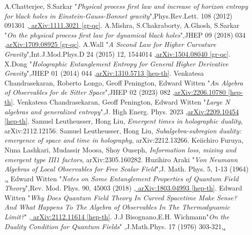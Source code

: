 \documentclass[12pt]{article}
\begin{document}
\begin{thebibliography}{100}
 A.Chatterjee, S.Sarkar "\textit{Physical process first law and increase of horizon entropy for black holes in Einstein-Gauss-Bonnet gravity}",Phys.Rev.Lett. 108 (2012) 091301 ,\href{https://arxiv.org/abs/1111.3021}{	 arXiv:1111.3021 [gr-qc]}.
 A.Mishra, S.Chakraborty, A.Ghosh, S.Sarkar "\textit{On the physical process first law for dynamical black holes}",JHEP 09 (2018) 034  ,\href{https://arxiv.org/abs/1709.08925}{arXiv:1709.08925 [gr-qc]}.
 A.Wall "\textit{A Second Law for Higher Curvature Gravity}",Int.J.Mod.Phys.D 24 (2015) 12, 1544014 ,\href{https://arxiv.org/abs/1504.08040}{arXiv:1504.08040 [gr-qc]}.
 X.Dong "\textit{Holographic Entanglement Entropy for General Higher Derivative Gravity}",JHEP 01 (2014) 044  ,\href{https://arxiv.org/abs/1310.5713}{arXiv:1310.5713 [hep-th]}.
 Venkatesa Chandrasekaran, Roberto Longo, Geoff Penington, Edward Witten "\textit{An Algebra of Observables for de Sitter Space}",JHEP 02 (2023) 082  ,\href{https://arxiv.org/abs/2206.10780}{arXiv:2206.10780 [hep-th]}.
 Venkatesa Chandrasekaran, Geoff Penington, Edward Witten "\textit{Large N algebras and generalized entropy}",J. High Energ. Phys. 2023  ,\href{https://arxiv.org/abs/2209.10454}{arXiv:2209.10454 [hep-th]}.
  Samuel Leutheusser, Hong Liu, \emph{Emergent times in holographic duality}, arXiv:2112.12156.
  Samuel Leutheusser, Hong Liu, \emph{Subalgebra-subregion duality: emergence of space and time in holography},  	 arXiv:2212.13266.
  Keiichiro Furuya, Nima Lashkari, Mudassir Moosa, Shoy Ouseph, \emph{Information loss, mixing and emergent type III1 factors}, arXiv:2305.160282.
 Huzihiro Araki "\textit{Von Neumann Algebras of Local Observables for Free Scalar Field}",J. Math. Phys. 5, 1-13 (1964) ,\href{https://pubs.aip.org/aip/jmp/article/5/1/1/719398/Von-Neumann-Algebras-of-Local-Observables-for-Free}.
  Edward Witten "\textit{Notes on Some Entanglement Properties of Quantum Field Theory}",Rev. Mod. Phys. 90, 45003 (2018)  ,\href{https://arxiv.org/abs/1803.04993}{	arXiv:1803.04993 [hep-th]}.
  Edward Witten "\textit{Why Does Quantum Field Theory In Curved Spacetime Make Sense? And What Happens To The Algebra of Observables In The Thermodynamic Limit?}" ,\href{https://arxiv.org/abs/2112.11614}{	 arXiv:2112.11614 [hep-th]}.
 J.J Bisognano,E.H. Wichmann"\textit{On the Duality Condition for Quantum Fields}" ,J.Math.Phys. 17 (1976) 303-321,\href{https://inspirehep.net/literature/113206}.

\end{thebibliography}
\end{document}
